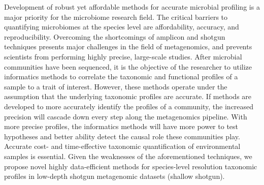 
Development of robust yet affordable methods for accurate microbial profiling is a major priority for the microbiome research field. The critical barriers to quantifying microbiomes at the species level are affordability, accuracy, and reproducibility. Overcoming the shortcomings of amplicon and shotgun techniques presents major challenges in the field of metagenomics, and prevents scientists from performing highly precise, large-scale studies. After microbial communities have been sequenced, it is the objective of the researcher to utilize informatics methods to correlate the taxonomic and functional profiles of a sample to a trait of interest. However, these methods operate under the assumption that the underlying taxonomic profiles are accurate. If methods are developed to more accurately identify the profiles of a community, the increased precision will cascade down every step along the metagenomics pipeline. With more precise profiles, the informatics methods will have more power to test hypotheses and better ability detect the causal role these communities play. Accurate cost- and time-effective taxonomic quantification of environmental samples is essential. Given the weaknesses of the aforementioned techniques, we propose novel highly data-efficient methods for species-level resolution taxonomic profiles in low-depth shotgun metagenomic datasets (shallow shotgun).

